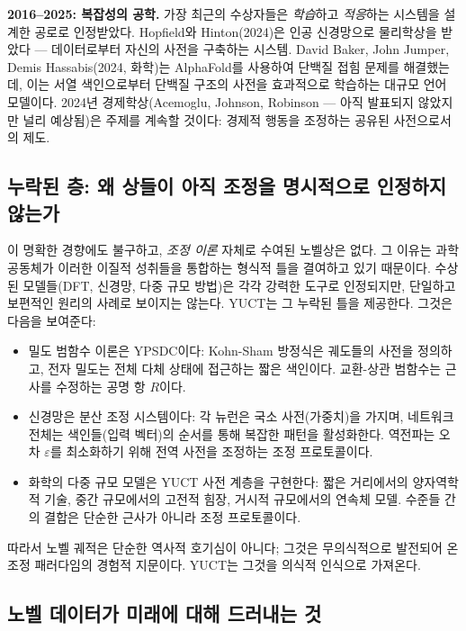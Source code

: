 \documentclass[12pt,a4paper]{article}
\begin{document}
	\textbf{2016–2025: 복잡성의 공학.} 가장 최근의 수상자들은 \emph{학습}하고 \emph{적응}하는 시스템을 설계한 공로로 인정받았다. Hopfield와 Hinton(2024)은 인공 신경망으로 물리학상을 받았다 — 데이터로부터 자신의 사전을 구축하는 시스템. David Baker, John Jumper, Demis Hassabis(2024, 화학)는 AlphaFold를 사용하여 단백질 접힘 문제를 해결했는데, 이는 서열 색인으로부터 단백질 구조의 사전을 효과적으로 학습하는 대규모 언어 모델이다. 2024년 경제학상(Acemoglu, Johnson, Robinson — 아직 발표되지 않았지만 널리 예상됨)은 주제를 계속할 것이다: 경제적 행동을 조정하는 공유된 사전으로서의 제도.
	
	\subsection{누락된 층: 왜 상들이 아직 조정을 명시적으로 인정하지 않는가}
	
	이 명확한 경향에도 불구하고, \emph{조정 이론} 자체로 수여된 노벨상은 없다. 그 이유는 과학 공동체가 이러한 이질적 성취들을 통합하는 형식적 틀을 결여하고 있기 때문이다. 수상된 모델들(DFT, 신경망, 다중 규모 방법)은 각각 강력한 도구로 인정되지만, 단일하고 보편적인 원리의 사례로 보이지는 않는다. YUCT는 그 누락된 틀을 제공한다. 그것은 다음을 보여준다:
	\begin{itemize}
		\item 밀도 범함수 이론은 YPSDC이다: Kohn-Sham 방정식은 궤도들의 사전을 정의하고, 전자 밀도는 전체 다체 상태에 접근하는 짧은 색인이다. 교환-상관 범함수는 근사를 수정하는 공명 항 \(R\)이다.
		\item 신경망은 분산 조정 시스템이다: 각 뉴런은 국소 사전(가중치)을 가지며, 네트워크 전체는 색인들(입력 벡터)의 순서를 통해 복잡한 패턴을 활성화한다. 역전파는 오차 \(\varepsilon\)를 최소화하기 위해 전역 사전을 조정하는 조정 프로토콜이다.
		\item 화학의 다중 규모 모델은 YUCT 사전 계층을 구현한다: 짧은 거리에서의 양자역학적 기술, 중간 규모에서의 고전적 힘장, 거시적 규모에서의 연속체 모델. 수준들 간의 결합은 단순한 근사가 아니라 조정 프로토콜이다.
	\end{itemize}
	따라서 노벨 궤적은 단순한 역사적 호기심이 아니다; 그것은 무의식적으로 발전되어 온 조정 패러다임의 경험적 지문이다. YUCT는 그것을 의식적 인식으로 가져온다.
	
	\subsection{노벨 데이터가 미래에 대해 드러내는 것}
	
\end{document}
